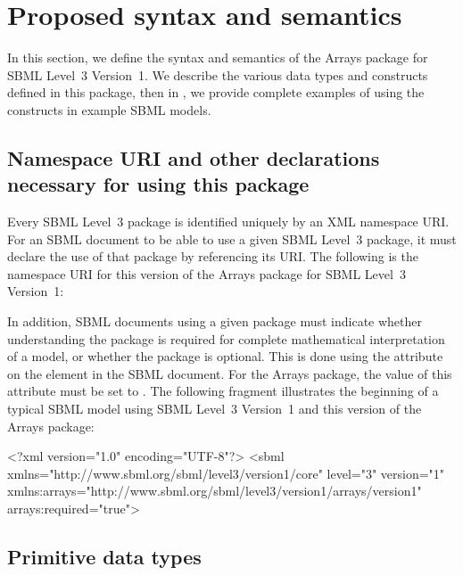 
\section{Proposed syntax and semantics}
\label{syntax}

In this section, we define the syntax and semantics of the Arrays package for SBML Level~3 Version~1.   We describe the various data types and constructs defined in this package, then in , we provide complete examples of using the constructs in example SBML models.

\subsection{Namespace URI and other declarations necessary for using this package}
\label{xml-namespace}

Every SBML Level~3 package is identified uniquely by an XML namespace URI.
For an SBML document to be able to use a given SBML Level~3 package, it
must declare the use of that package by referencing its URI.   The following
is the namespace URI for this version of the Arrays
package for SBML Level~3 Version~1:
\begin{center}
\end{center}

In addition, SBML documents using a given package must indicate whether
understanding the package is required for complete mathematical
interpretation of a model, or whether the package is optional.   This is
done using the attribute  on the  element in
the SBML document.   For the Arrays package, the value of
this attribute must be set to .
The following fragment illustrates the beginning of a typical SBML model
using SBML Level~3 Version~1 and this version of the Arrays package:

\begin{example}
<?xml version="1.0" encoding="UTF-8"?>
<sbml xmlns="http://www.sbml.org/sbml/level3/version1/core" level="3" version="1"
  xmlns:arrays="http://www.sbml.org/sbml/level3/version1/arrays/version1" arrays:required="true">
\end{example}

\subsection{Primitive data types}

